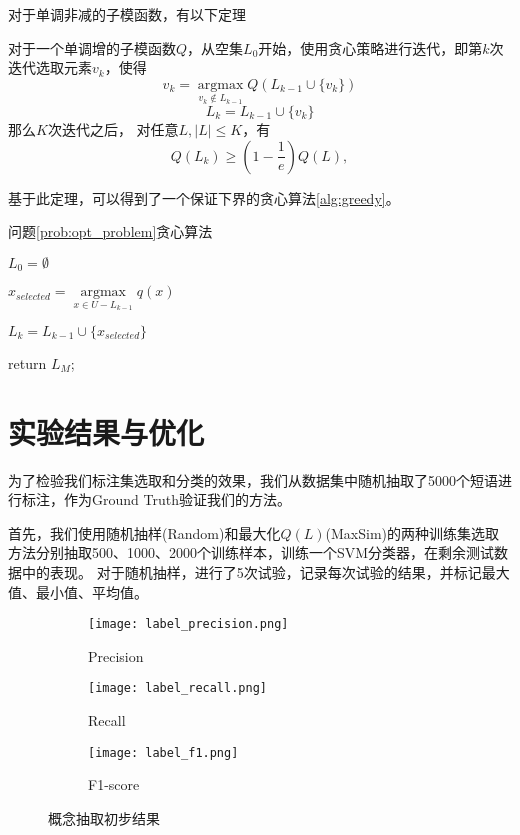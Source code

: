 对于单调非减的子模函数，有以下定理
\begin{theorem}
对于一个单调增的子模函数$Q$，从空集$L_0$开始，使用贪心策略进行迭代，即第$k$次迭代选取元素$v_k$，使得
\[
	v_k = \mathop {\arg \max }\limits_{v_k \notin L_{k-1} } Q(L_{k-1}\cup \{v_k\}) 
\]
\[
	L_k = L_{k-1} \cup \{ v_k \} 
\]
那么$K$次迭代之后， 对任意$L, |L| \le K$，有
\[
	Q(L_k) \ge (1-\frac{1}{e}) Q(L),
\]
\end{theorem}

基于此定理，可以得到了一个保证下界的贪心算法\ref{alg:greedy}。
\begin{algorithm}
  \caption{问题\ref{prob:opt_problem}贪心算法}
  $L_0 = \emptyset$\;
  {

  	$x_{selected} = \mathop {\arg \max }\limits_{x \in U - {L_{k - 1}}} q(x)$

  	$L_k = L_{k-1}\cup\{x_{selected}\}$ 
  }
  return $L_M$;
  \label{alg:greedy}
\end{algorithm}

\section{实验结果与优化}
为了检验我们标注集选取和分类的效果，我们从数据集中随机抽取了5000个短语进行标注，作为Ground Truth验证我们的方法。

首先，我们使用随机抽样(Random)和最大化$Q(L)$(MaxSim)的两种训练集选取方法分别抽取500、1000、2000个训练样本，训练一个SVM分类器，在剩余测试数据中的表现。
对于随机抽样，进行了5次试验，记录每次试验的结果，并标记最大值、最小值、平均值。

\begin{figure}[h!]
  \centering
  \begin{subfigure}{0.4\textwidth}
    \texttt{[image: label\_precision.png]}
    \caption{Precision}
  \end{subfigure} 
  
  \begin{subfigure}{0.4\textwidth}
    \texttt{[image: label\_recall.png]}
    \caption{Recall}
  \end{subfigure}

  \begin{subfigure}{0.4\textwidth}
  	\texttt{[image: label\_f1.png]}
  	\caption{F1-score}
  \end{subfigure}
  \caption{概念抽取初步结果}
  \label{fig:testing_vs_random}
\end{figure}

